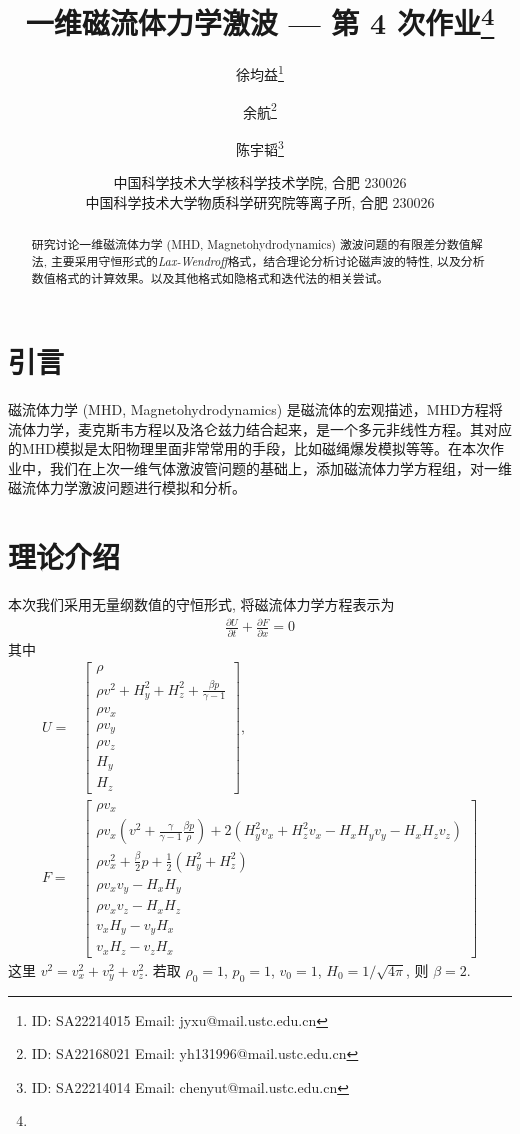 \documentclass[10.5pt
]{article}
\title{一维磁流体力学激波 --- 第 4 次作业\footnote{\Term\Course}}
\author{徐均益\footnote{ID: SA22214015 Email: jyxu@mail.ustc.edu.cn}
  \and
  余航\footnote{ID: SA22168021 Email: yh131996@mail.ustc.edu.cn}
  \and
  陈宇韬\footnote{ID: SA22214014 Email: chenyut@mail.ustc.edu.cn}
}
\date{%
\scriptsize%
中国科学技术大学核科学技术学院, 合肥 230026 \\
中国科学技术大学物质科学研究院等离子所, 合肥 230026
%
}
\begin{document}
\maketitle

\begin{abstract}
研究讨论一维磁流体力学 (MHD, Magnetohydrodynamics) 激波问题的有限差分数值解法, 主要采用守恒形式的\textit{Lax-Wendroff}格式，结合理论分析讨论磁声波的特性,
以及分析数值格式的计算效果。以及其他格式如隐格式和迭代法的相关尝试。
\end{abstract}

\section{引言}
磁流体力学 (MHD, Magnetohydrodynamics) 是磁流体的宏观描述，MHD方程将流体力学，麦克斯韦方程以及洛仑兹力结合起来，是一个多元非线性方程。其对应的MHD模拟是太阳物理里面非常常用的手段，比如磁绳爆发模拟等等。在本次作业中，我们在上次一维气体激波管问题的基础上，添加磁流体力学方程组，对一维磁流体力学激波问题进行模拟和分析。

\section{理论介绍}\label{DLess}
本次我们采用无量纲数值的守恒形式, 将磁流体力学方程表示为
\begin{align}
\frac{\partial U}{\partial t} + \frac{\partial F}{\partial x} = 0 \label{Eqn:MHD}
\end{align}
其中
\begin{align}
U = & \left[ \begin{array}{l}
\rho\\
\rho v^2 + H_y^2 + H_z^2 + \frac{\beta p}{\gamma -1}
\\
\rho v_x\\
\rho v_y\\
\rho v_z\\
H_y\\
H_z
\end{array} \right]\label{Eqn:Flux_U}, \\
F = & \left[ \begin{array}{l}
\rho v_x\\
\rho v_x \left(v^2 + \frac{\gamma}{\gamma - 1} \frac{\beta p}{\rho} \right) + 2(H_y^2 v_x + H_z^2 v_x - H_x H_y v_y - H_x H_z v_z)
\\
\rho v_x^2 + \frac{\beta}{2} p + \frac{1}{2} (H_y^2 + H_z^2)\\
\rho v_x v_y - H_x H_y\\
\rho v_x v_z - H_x H_z\\
v_x H_y - v_y H_x\\
v_x H_z - v_z H_x
\end{array} \right] \label{Eqn:Flux}
\end{align}
这里 $v^2 = v_x^2 + v_y^2 + v_z^2$. 若取 $\rho_0 = 1$, $p_0 = 1$, $v_0 = 1$, $H_0 = 1/\sqrt{4\pi}$, 则 $\beta = 2$.
\end{document}
